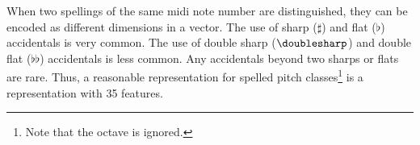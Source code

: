 
When two spellings of the same \gls{midi} note number are
distinguished, they can be encoded as different dimensions
in a vector. The use of sharp ($\sharp$) and flat ($\flat$)
accidentals is very common. The use of double sharp
($\doublesharp$) and double flat ($\flat\flat$) accidentals
is less common. Any accidentals beyond two sharps or flats
are rare. Thus, a reasonable representation for spelled
pitch classes\footnote{Note that the octave is ignored.} is
a representation with 35 features.